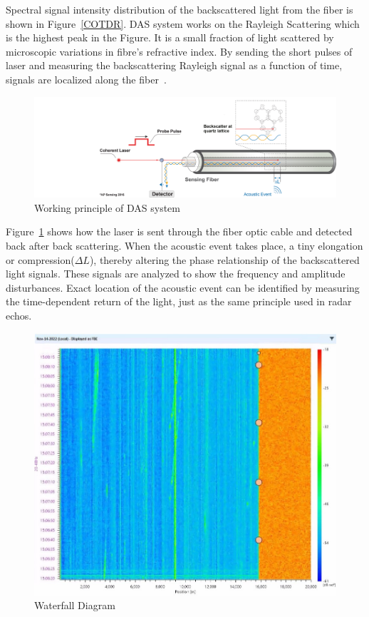 Spectral signal intensity distribution of the backscattered light from the fiber is shown in Figure~\ref{COTDR}. DAS system works on the Rayleigh Scattering which is the highest peak in the Figure. It is a small fraction of light scattered by microscopic variations in fibre's refractive index. By sending the short pulses of laser and measuring the backscattering Rayleigh signal as a function of time, signals are localized along the fiber~\cite{masoudi}.  

\begin{figure}[h]
    \centering
    \includegraphics[width=0.8\linewidth]{Bilder/jpg/DAS_Acoustic_Event.jpg}
    \caption{Working principle of DAS system~\cite{DAS_Manual}}
    \label{DAS_working}
\end{figure}

Figure~\ref{DAS_working} shows how the laser is sent through the fiber optic cable and detected back after back scattering. When the acoustic event takes place, a tiny elongation or compression($\Delta L$), thereby altering the phase relationship of the backscattered light signals. These signals are analyzed to show the frequency and amplitude disturbances. Exact location of the acoustic event can be identified by measuring the time-dependent return of the light, just as the same principle used in radar echos. 

\begin{figure}[h]
  \centering
  \includegraphics[width=0.7\linewidth]{Bilder/jpg/DAS Waterfall.jpg}
  \caption{Waterfall Diagram~\cite{Waterfall}}
  \label{DAS_waterfall}
\end{figure}

